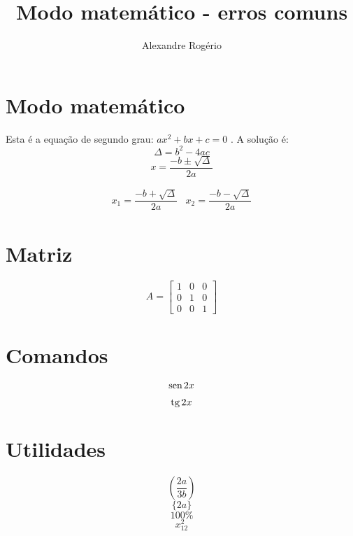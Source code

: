 \documentclass{article}
\renewcommand{\sin}{\mathrm{sen\hspace{0.5mm}}}
\renewcommand{\tan}{\mathrm{tg\hspace{0.5mm}}}
\begin{document}
	
	\title{\textbf{{\Huge Modo matemático - erros comuns}}}
	\author{Alexandre Rogério}
	\maketitle
	\thispagestyle{empty} %
	\newpage
	
	\setcounter{page}{1}
	\tableofcontents
	\newpage
	
	\listoffigures
	\newpage
	
	\listoftables
	\newpage
	
	\setcounter{page}{1}
	
	\section{Modo matemático}
	Esta é a equação de segundo grau: $ ax^2 + bx + c = 0 $ . A solução é:
	\begin{equation*}
		\Delta = b^2 - 4ac
	\end{equation*}
	\begin{equation*}
		x = \frac{-b \pm \sqrt{\Delta}}{2a}
	\end{equation*}

	\begin{equation*}
		\begin{array}{cc}
			x_1 = \dfrac{-b + \sqrt{\Delta}}{2a}	&
			x_2 = \dfrac{-b - \sqrt{\Delta}}{2a}
		\end{array}
	\end{equation*}

	\section{Matriz}
	\begin{equation*}
		A = \begin{bmatrix}
			1 & 0 & 0 \\
			0 & 1 & 0 \\
			0 & 0 & 1
		\end{bmatrix}
	\end{equation*}

	\section{Comandos}
	\begin{equation*}
		\sin{2x}
	\end{equation*}

	\begin{equation*}
		\tan{2x}
	\end{equation*}

	\section{Utilidades}
	\begin{equation*}
		\left(\frac{2a}{3b}\right)
	\end{equation*}
	\begin{equation*}
		\{2a\}
	\end{equation*}
	\begin{equation*}
		100\%
	\end{equation*}
	\begin{equation*}
		x_{12}^2
	\end{equation*}
\end{document}
